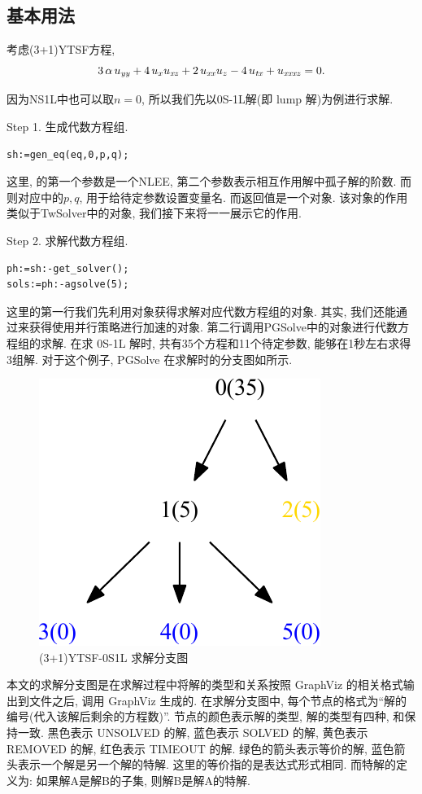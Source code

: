 \subsection{基本用法}
考虑(3+1)YTSF方程\CITEcaYTSF,
\begin{equation}
    3\,\alpha\,u_{{{\it yy}}}+4\,u_{{x}}u_{{{\it xz}}}+2\,u_{{{\it xx}}}u_{{z}}-4\,u_{{{\it tx}}}+u_{{{\it xxxz}}}=0. 
\end{equation}

因为NS1L中也可以取$n=0$, 所以我们先以0S-1L解(即 lump 解)为例进行求解. 

Step 1. 生成代数方程组.
\begin{verbatim}
sh:=gen_eq(eq,0,p,q);
\end{verbatim}
这里,  的第一个参数是一个NLEE, 第二个参数表示相互作用解中孤子解的阶数. 而则对应中的$p,q$, 用于给待定参数设置变量名. 而返回值是一个对象. 该对象的作用类似于TwSolver中的对象, 我们接下来将一一展示它的作用. 

Step 2. 求解代数方程组.
\begin{verbatim}
ph:=sh:-get_solver();
sols:=ph:-agsolve(5);
\end{verbatim}
这里的第一行我们先利用对象获得求解对应代数方程组的对象. 其实, 我们还能通过来获得使用并行策略进行加速的对象. 第二行调用PGSolve中的对象进行代数方程组的求解. 在求 0S-1L 解时, 共有35个方程和11个待定参数, 能够在1秒左右求得3组解. 对于这个例子, PGSolve 在求解时的分支图如所示. 

\begin{figure}[htbp]
\centering
\includegraphics[width=.3\textwidth]{fig/0S1L.pdf}
\caption{(3+1)YTSF-0S1L 求解分支图}\label{sb0}
\end{figure}

本文的求解分支图是在求解过程中将解的类型和关系按照 GraphViz\cite{ellson2001graphviz} 的相关格式输出到文件之后, 调用 GraphViz 生成的. 在求解分支图中, 每个节点的格式为``解的编号(代入该解后剩余的方程数)''. 节点的颜色表示解的类型, 解的类型有四种, 和保持一致. 黑色表示 UNSOLVED 的解, 蓝色表示 SOLVED 的解, 黄色表示 REMOVED 的解, 红色表示 TIMEOUT 的解. 绿色的箭头表示等价的解, 蓝色箭头表示一个解是另一个解的特解. 这里的等价指的是表达式形式相同. 而特解的定义为: 如果解A是解B的子集, 则解B是解A的特解. 

